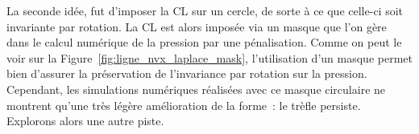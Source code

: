\documentclass[main.tex]{subfiles}
\begin{document}
La seconde idée, fut d'imposer la CL sur un cercle, de sorte à ce que celle-ci soit invariante par rotation. 
La CL est alors imposée via un masque que l'on gère dans le calcul numérique de la pression par une pénalisation.  
Comme on peut le voir sur la Figure~\ref{fig:ligne_nvx_laplace_mask}, l'utilisation d'un masque permet bien d'assurer la préservation de l'invariance par rotation sur la pression. 
Cependant, %
les simulations numériques réalisées avec ce masque circulaire ne montrent qu'une très légère amélioration 
de la forme~: le trèfle persiste. 
Explorons alors une autre piste. 
\end{document}
